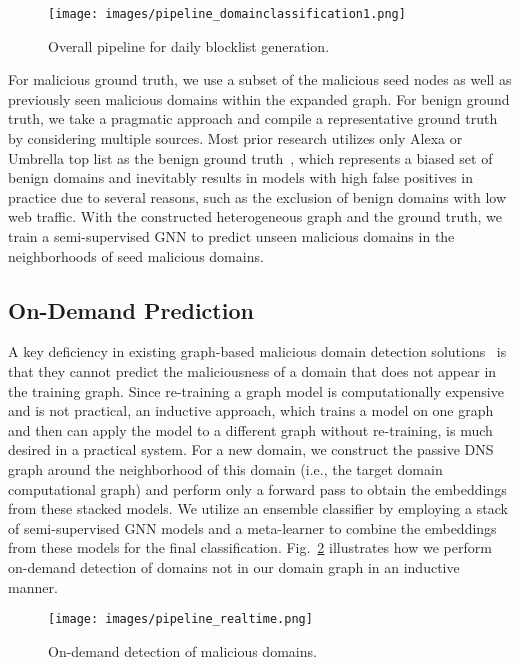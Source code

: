 \begin{figure}
\centering
\texttt{[image: images/pipeline\_domainclassification1.png]}
\caption{Overall pipeline for daily blocklist generation.}
\label{fig:pipeline}
\vspace{-2mm}
\end{figure}

For malicious ground truth, we use a subset of the malicious seed nodes as well as previously seen malicious domains within the expanded graph. For benign ground truth, we take a pragmatic approach and compile a representative ground truth by considering multiple sources. Most prior research utilizes only Alexa or Umbrella top list as the benign ground truth~\cite{Bahnsen:2017:PhishingURLsNN, bp_mal2:2020}, which represents a biased set of benign domains and inevitably results in models with high false positives in practice due to several reasons, such as the exclusion of benign domains with low web traffic.  With the constructed heterogeneous graph and the ground truth, we train a semi-supervised GNN to predict unseen malicious domains in the neighborhoods of seed malicious domains. 

\subsection{On-Demand Prediction}
A key deficiency in existing graph-based malicious domain detection solutions~\cite{bp_mal2:2020, hgdom:NOMS:2020} is that they cannot predict the maliciousness of a domain that does not appear in the training graph.
Since re-training a graph model is computationally expensive and is not practical,
an inductive approach, which trains a model on one graph and then can apply the model to a different graph without re-training, is much desired in a practical system.
For a new domain, we construct the passive DNS graph around the neighborhood of this domain (i.e., the target domain computational graph) and perform only a forward pass to obtain the embeddings from these stacked models. We utilize an ensemble classifier by employing a stack of semi-supervised GNN models and a meta-learner to combine the embeddings from these models for the final classification.
Fig.~\ref{fig:realtime} illustrates how we perform on-demand detection of domains not in our domain graph in an inductive manner. 



\begin{figure}
\centering
\texttt{[image: images/pipeline\_realtime.png]}
\caption{On-demand detection of malicious domains.}
\label{fig:realtime}
\vspace{-2mm}
\end{figure}